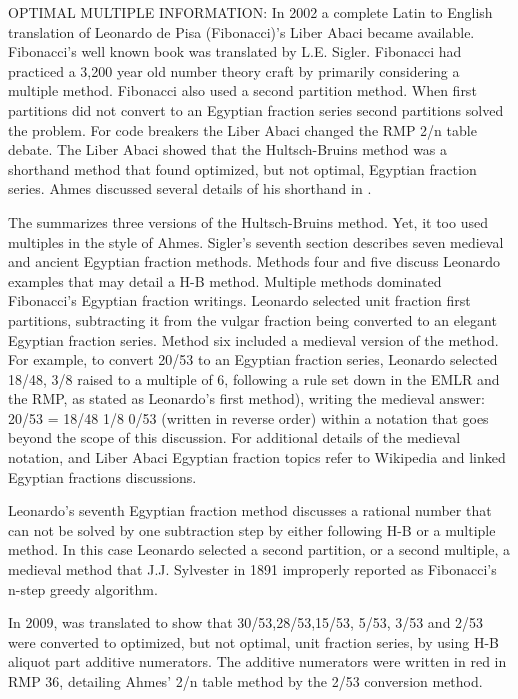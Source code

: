 \documentclass[12pt]{article}
\begin{document}
OPTIMAL MULTIPLE INFORMATION: In 2002 a complete Latin to English translation of Leonardo de Pisa (Fibonacci)'s Liber Abaci became available. Fibonacci's well known book was translated by L.E. Sigler. Fibonacci had practiced a 3,200 year old number theory craft by primarily considering a multiple method. Fibonacci also used a second partition method. When first partitions did not convert to an Egyptian fraction series second partitions solved the problem. For code breakers the Liber Abaci changed the RMP 2/n table debate. The Liber Abaci showed that the Hultsch-Bruins method was a shorthand method that found optimized, but not optimal,  Egyptian fraction series. Ahmes discussed several details of his shorthand in .

The  summarizes three versions of the Hultsch-Bruins method. Yet, it too used multiples in the style of Ahmes. Sigler's seventh section describes seven medieval and ancient Egyptian fraction methods. Methods four and five discuss Leonardo examples that may detail a H-B method. Multiple methods dominated Fibonacci's Egyptian fraction writings. Leonardo selected unit fraction first partitions, subtracting it from the vulgar fraction being converted to an elegant Egyptian fraction series. Method six included a medieval version of the method. For example, to convert 20/53 to an Egyptian fraction series, Leonardo selected 18/48, 3/8 raised to a multiple of 6, following a rule set down in the EMLR and the RMP, as stated as Leonardo's first method), writing the medieval answer:  20/53 = 18/48 1/8 0/53 (written in reverse order) within a notation that goes beyond the scope of this discussion. For additional details of the medieval notation, and Liber Abaci Egyptian fraction topics refer to Wikipedia and linked Egyptian fractions discussions.

Leonardo's seventh Egyptian fraction method discusses a rational number that can not be solved by one subtraction step by either following H-B or a multiple method. In this case Leonardo selected a second partition, or a second multiple, a medieval method that J.J. Sylvester in 1891 improperly reported as Fibonacci's n-step greedy algorithm.

In 2009,  was translated to show that 30/53,28/53,15/53, 5/53, 3/53 and 2/53 were converted to optimized, but not optimal, unit fraction series, by using H-B aliquot part additive numerators. The additive numerators were written in red in RMP 36, detailing Ahmes' 2/n table method by the 2/53 conversion method.
\end{document}

